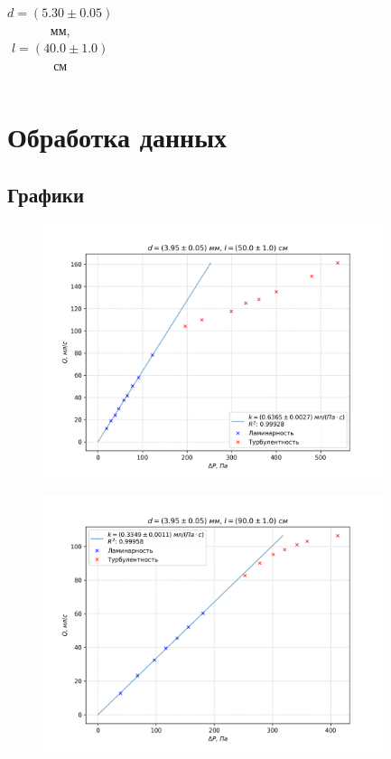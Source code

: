 \documentclass[a4paper,12pt]{article} %
\begin{document}
\begin{table}[ht!]
\caption{$d=(5.30 \pm 0.05)$ мм, $l=(40.0 \pm 1.0)$ см}
\begin{tabular}{ cc }


\end{tabular}
\end{table}

\newpage

\section{Обработка данных}

\subsection*{Графики}

\begin{figure}[h!]
\begin{center}
\includegraphics[width=0.89\textwidth]{Q(P)1.png}
\end{center}
\end{figure}

\begin{figure}[h!]
\begin{center}
\includegraphics[width=0.89\textwidth]{Q(P)2.png}
\end{center}
\end{figure}
\end{document}
